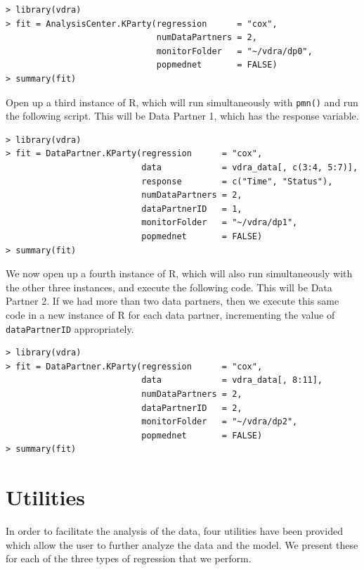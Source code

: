 \documentclass[12]{article}
\begin{document}
\begin{verbatim}
> library(vdra)
> fit = AnalysisCenter.KParty(regression      = "cox",
                              numDataPartners = 2,
                              monitorFolder   = "~/vdra/dp0",
                              popmednet       = FALSE)
> summary(fit)
\end{verbatim}

Open up a third instance of R, which will run simultaneously with \verb"pmn()" and run the following script.  This will be Data Partner 1, which has the response variable.


\begin{verbatim}
> library(vdra)
> fit = DataPartner.KParty(regression      = "cox",
                           data            = vdra_data[, c(3:4, 5:7)],
                           response        = c("Time", "Status"),
                           numDataPartners = 2,
                           dataPartnerID   = 1,
                           monitorFolder   = "~/vdra/dp1",
                           popmednet       = FALSE)
> summary(fit)
\end{verbatim}

We now open up a fourth instance of R, which will also run simultaneously with the other three instances, and execute the following code.  This will be Data Partner 2.  If we had more than two data partners, then we execute this same code in a new instance of R for each data partner, incrementing the value of \verb"dataPartnerID" appropriately.

\begin{verbatim}
> library(vdra)
> fit = DataPartner.KParty(regression      = "cox",
                           data            = vdra_data[, 8:11],
                           numDataPartners = 2,
                           dataPartnerID   = 2,
                           monitorFolder   = "~/vdra/dp2",
                           popmednet       = FALSE)
> summary(fit)
\end{verbatim}


\section{Utilities}

In order to facilitate the analysis of the data, four utilities have been provided which allow the user to further analyze the data and the model.  We present these for each of the three types of regression that we perform.
\end{document}
